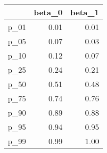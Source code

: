 \begin{table}[ht]
\centering
\begin{tabular}{rrr}
  \hline
 & beta\_0 & beta\_1 \\ 
  \hline
p\_01 & 0.01 & 0.01 \\ 
  p\_05 & 0.07 & 0.03 \\ 
  p\_10 & 0.12 & 0.07 \\ 
  p\_25 & 0.24 & 0.21 \\ 
  p\_50 & 0.51 & 0.48 \\ 
  p\_75 & 0.74 & 0.76 \\ 
  p\_90 & 0.89 & 0.88 \\ 
  p\_95 & 0.94 & 0.95 \\ 
  p\_99 & 0.99 & 1.00 \\ 
   \hline
\end{tabular}
\end{table}
